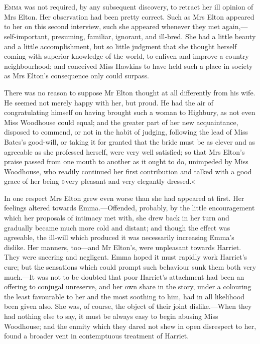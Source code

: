 \chapter[Chapter \thechapter]{}
\lettrine[lines=4,lraise=0.3]{E}{mma} was not required, by any subsequent discovery, to retract her ill opinion of Mrs Elton. Her observation had been pretty correct. Such as Mrs Elton appeared to her on this second interview, such she appeared whenever they met again,—self-important, presuming, familiar, ignorant, and ill-bred. She had a little beauty and a little accomplishment, but so little judgment that she thought herself coming with superior knowledge of the world, to enliven and improve a country neighbourhood; and conceived Miss Hawkins to have held such a place in society as Mrs Elton's consequence only could surpass.

There was no reason to suppose Mr Elton thought at all differently from his wife. He seemed not merely happy with her, but proud. He had the air of congratulating himself on having brought such a woman to Highbury, as not even Miss Woodhouse could equal; and the greater part of her new acquaintance, disposed to commend, or not in the habit of judging, following the lead of Miss Bates's good-will, or taking it for granted that the bride must be as clever and as agreeable as she professed herself, were very well satisfied; so that Mrs Elton's praise passed from one mouth to another as it ought to do, unimpeded by Miss Woodhouse, who readily continued her first contribution and talked with a good grace of her being »very pleasant and very elegantly dressed.«

In one respect Mrs Elton grew even worse than she had appeared at first. Her feelings altered towards Emma.—Offended, probably, by the little encouragement which her proposals of intimacy met with, she drew back in her turn and gradually became much more cold and distant; and though the effect was agreeable, the ill-will which produced it was necessarily increasing Emma's dislike. Her manners, too—and Mr Elton's, were unpleasant towards Harriet. They were sneering and negligent. Emma hoped it must rapidly work Harriet's cure; but the sensations which could prompt such behaviour sunk them both very much.—It was not to be doubted that poor Harriet's attachment had been an offering to conjugal unreserve, and her own share in the story, under a colouring the least favourable to her and the most soothing to him, had in all likelihood been given also. She was, of course, the object of their joint dislike.—When they had nothing else to say, it must be always easy to begin abusing Miss Woodhouse; and the enmity which they dared not shew in open disrespect to her, found a broader vent in contemptuous treatment of Harriet.

